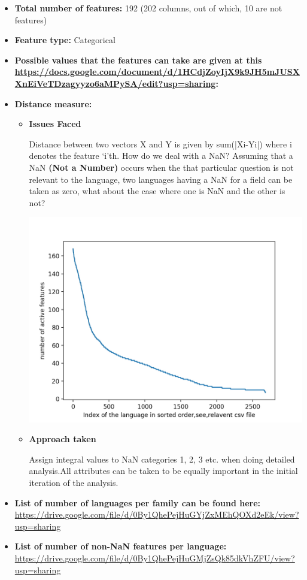 \begin{itemize}
\item \textbf{Total number of features:} 192 (202 columns, out of which, 10 are not features)

 \item \textbf{Feature type:} Categorical

 \item \textbf{Possible values that the features can take are given at this \url{https://docs.google.com/document/d/1HCdjZoyIjX9k9JH5mJUSXXnEiVeTDzagyyzo6aMPySA/edit?usp=sharing}:}

 \newpage

 \item \textbf{Distance measure:}

\begin{itemize}
\item 
 \textbf{Issues Faced}

 Distance between two vectors X and Y is given by sum(|Xi-Yi|) where i denotes the feature ‘i’th. How do we deal with a NaN? Assuming that a NaN \textbf{(Not a Number)} occurs when the that particular question is not relevant to the language, two languages having a NaN for a field can be taken as zero, what about the case where one is NaN and the other is not?

 \includegraphics[scale=0.18]{images/6-01.jpg}

 \item 
 \textbf{Approach taken}

 Assign integral values to NaN categories 1, 2, 3 etc. when doing detailed analysis.All attributes can be taken to be equally important in the initial iteration of the analysis.

\end{itemize}

\item \textbf{List of number of languages per family can be found here:} \url{https://drive.google.com/file/d/0By1QhePejHuGYjZxMEhQOXd2eEk/view?usp=sharing}

 \item \textbf{List of number of non-NaN features per language:} \url{https://drive.google.com/file/d/0By1QhePejHuGMjZsQk85dkVhZFU/view?usp=sharing}

\end{itemize}

